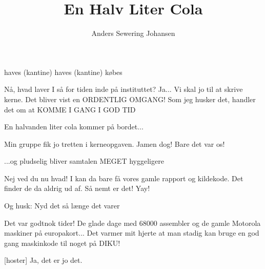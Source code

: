 \documentclass[a4paper,12pt]{article}
\title{En Halv Liter Cola}
\author{Anders Sewering Johansen}
\begin{document}
\maketitle

\begin{sketch}

\begin{roles}
\end{roles}

\begin{props}
   haves (kantine)
   haves (kantine)
   købes
\end{props}


 Nå, hvad laver I så for tiden inde på instituttet?
 Ja... Vi skal jo til at skrive kerne. Det bliver vist en ORDENTLIG
OMGANG!
 Som jeg husker det, handler det om at KOMME I GANG I GOD TID

 En halvanden liter cola kommer på bordet...

 Min gruppe fik jo tretten i kerneopgaven.
 Jamen dog! Bare det var os!

 ...og pludselig bliver samtalen MEGET hyggeligere

 Nej ved du nu hvad! I kan da bare få vores gamle rapport og
kildekode. Det finder de da aldrig ud af. Så nemt er det!
 Yay!

 Og husk: Nyd det så længe det varer

 Det var godtnok tider! De glade dage med 68000 assembler og de
gamle Motorola maskiner på europakort... Det varmer mit hjerte at man
stadig kan bruge en god gang maskinkode til noget på DIKU!

[hoster] Ja, det er jo det.

\end{sketch}
\end{document}
